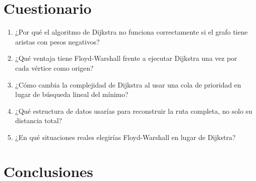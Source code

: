\documentclass{article}
\begin{document}
\section{Cuestionario}

\begin{enumerate}
    \item ¿Por qué el algoritmo de Dijkstra no funciona correctamente si el grafo tiene aristas con pesos negativos?

    \item ¿Qué ventaja tiene Floyd-Warshall frente a ejecutar Dijkstra una vez por cada vértice como origen?

    \item ¿Cómo cambia la complejidad de Dijkstra al usar una cola de prioridad en lugar de búsqueda lineal del mínimo?

    \item ¿Qué estructura de datos usarías para reconstruir la ruta completa, no solo su distancia total?

    \item ¿En qué situaciones reales elegirías Floyd-Warshall en lugar de Dijkstra?
\end{enumerate}

\section{Conclusiones}

	
	
    
%
%
%
			
\end{document}
